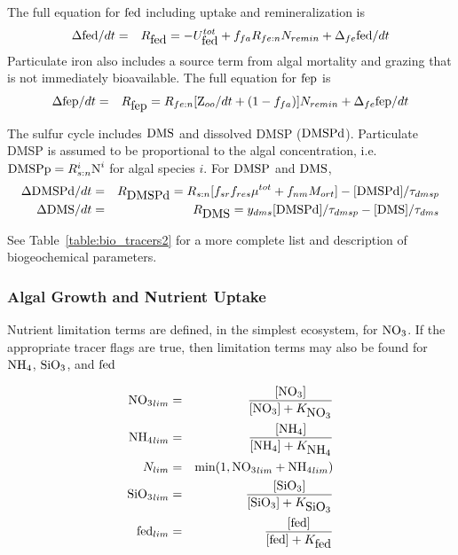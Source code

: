 The full equation for $\mbox{fed}$ including uptake and remineralization is
\begin{eqnarray}
\Delta \mbox{fed}/dt & = & R_{\mbox{fed}} = -U^{tot}_{\mbox{fed}} + f_{fa}R_{fe:n}N_{remin}
+ \Delta_{fe}\mbox{fed}/dt
\end{eqnarray}
Particulate iron also includes a source term from algal mortality and grazing that is not immediately
bioavailable.  The full equation for $\mbox{fep}$ is
\begin{eqnarray}
\Delta \mbox{fep}/dt & = & R_{\mbox{fep}} =  R_{fe:n}[\mbox{Z}_{oo}/dt + (1-f_{fa})]N_{remin}
+ \Delta_{fe}\mbox{fep}/dt
\end{eqnarray} 

The sulfur cycle includes $\mbox{DMS}$ and dissolved DMSP ($\mbox{DMSPd}$).
Particulate DMSP is assumed to be proportional to the algal
concentration, i.e. $\mbox{DMSPp} = R^i_{s:n}\mbox{N}^i$ for algal species $i$.
For $\mbox{DMSP}$ and $\mbox{DMS}$, 
\begin{eqnarray}
\Delta \mbox{DMSPd}/dt & = & R_{\mbox{DMSPd}} = R_{s:n}[ f_{sr}f_{res}\mu^{tot}
+f_{nm}M_{ort} ] - [\mbox{DMSPd}]/\tau_{dmsp} \nonumber \\
\Delta \mbox{DMS}/dt & = & R_{\mbox{DMS}} =  y_{dms}[\mbox{DMSPd}]/\tau_{dmsp} - [\mbox{DMS}]/\tau_{dms}
\end{eqnarray}

See Table~\ref{table:bio_tracers2} for a more complete list and
description of biogeochemical parameters.

\subsubsection{Algal Growth and Nutrient Uptake}

Nutrient limitation terms are defined, in the simplest ecosystem, for
$\mbox{NO$_3$}$.  If the appropriate tracer
flags are true, then limitation terms may also be found for $\mbox{NH$_4$}$, $\mbox{SiO$_3$}$,
and $\mbox{fed}$

\begin{eqnarray}
\mbox{NO$_3$}_{lim} & = & \frac{[\mbox{NO$_3$}]}{[\mbox{NO$_3$}] + K_{\mbox{NO$_3$}}} \nonumber \\
\mbox{NH$_4$}_{lim} & = & \frac{[\mbox{NH$_4$}]}{[\mbox{NH$_4$}] + K_{\mbox{NH$_4$}}}\nonumber \\
N_{lim} & = &\mbox{min}(1,\mbox{NO$_3$}_{lim} + \mbox{NH$_4$}_{lim}) \nonumber \\
\mbox{SiO$_3$}_{lim} & = & \frac{[\mbox{SiO$_3$}]}{[\mbox{SiO$_3$}] + K_{\mbox{SiO$_3$}}} \nonumber \\
\mbox{fed}_{lim} & = & \frac{[\mbox{fed}]}{[\mbox{fed}] + K_{\mbox{fed}}} 
\end{eqnarray}


